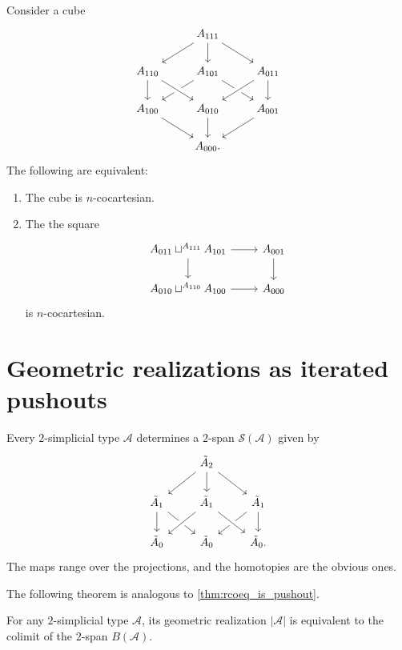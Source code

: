 \begin{conj}
Consider a cube
\begin{equation*}
\begin{tikzcd}
& A_{111} \arrow[dl] \arrow[d] \arrow[dr] \\
A_{110} \arrow[d] & A_{101} \arrow[dl] \arrow[dr] & A_{011} \arrow[d] \\
A_{100} \arrow[dr] & A_{010} \arrow[d] \arrow[from=ul,crossing over] \arrow[from=ur,crossing over] & A_{001} \arrow[dl] \\
& A_{000}.
\end{tikzcd}
\end{equation*}
The following are equivalent:
\begin{enumerate}
\item The cube is $n$-cocartesian.
\item The the square
\begin{equation*}
\begin{tikzcd}
A_{011}\sqcup^{A_{111}} A_{101} \arrow[r] \arrow[d] & A_{001} \arrow[d] \\
A_{010}\sqcup^{A_{110}} A_{100} \arrow[r] & A_{000}
\end{tikzcd}
\end{equation*}
is $n$-cocartesian.
\end{enumerate}
\end{conj}

\section{Geometric realizations as iterated pushouts}

\begin{defn}
Every $2$-simplicial type $\mathcal{A}$ determines a $2$-span $\mathcal{S}(\mathcal{A})$ given by
\begin{equation*}
\begin{tikzcd}
& \tilde A_2 \arrow[dl] \arrow[d] \arrow[dr] \\
\tilde A_1 \arrow[d] \arrow[dr] & \tilde A_1 \arrow[dl,crossing over] & \tilde A_1 \arrow[dl] \arrow[d] \\
\tilde A_0 & \tilde A_0 & \tilde A_0. \arrow[from=ul,crossing over] 
\end{tikzcd}
\end{equation*}
The maps range over the projections, and the homotopies are the obvious ones.
\end{defn}

The following theorem is analogous to \cref{thm:rcoeq_is_pushout}.
\begin{thm}
For any $2$-simplicial type $\mathcal{A}$, its geometric realization $|\mathcal{A}|$ is equivalent to the colimit of the $2$-span $B(\mathcal{A})$.
\end{thm}

